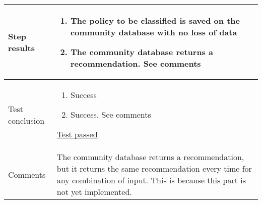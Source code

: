 \begin{center}
\begin{longtable}{ | p{4cm} | p{10cm} | }
			Step results & 	\begin{enumerate}
							\item The policy to be classified is saved on the community database with no loss of data 
							\item The community database returns a recommendation. See comments
						\end{enumerate}
							 \\  [3pt] \hline

			Test conclusion & 	\begin{enumerate}
							\item Success
							\item Success. See comments
						\end{enumerate}
						\underline{Test passed} \\ [3pt] \hline
			Comments & The community database returns a recommendation, but it returns the same recommendation every time for any combination of input. This is because this part is not yet implemented.
				\\ [3pt] \hline
		\end{longtable}
	\end{center}